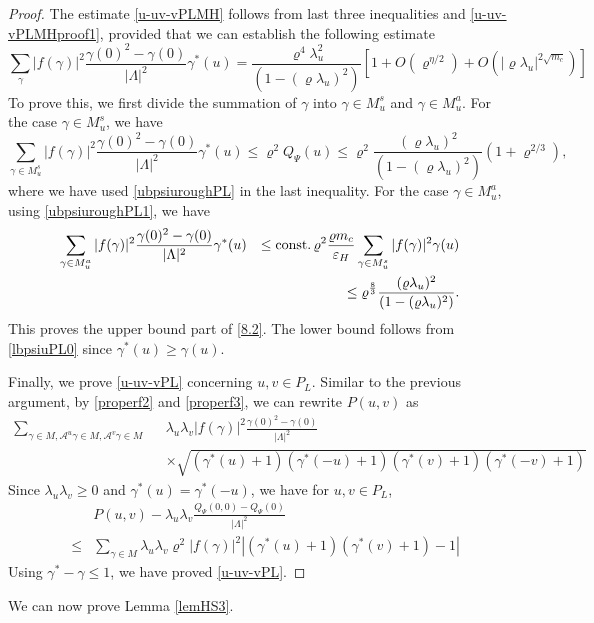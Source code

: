 \documentclass[11pt]{article}
\numberwithin{equation}{section}
\newcommand{\beq}{\begin{equation}}
\newcommand{\eeq}{\end{equation}}
\newcommand{\beqa}{\begin{eqnarray}}
\newcommand{\eeqa}{\end{eqnarray}}
\newcommand\eps{\varepsilon}
\newcommand\const{{\rm const.\, }}
\renewcommand\rho\varrho
\newtheorem{lem}{Lemma}[section]
\theoremstyle{definition}
\begin{document}
\begin{proof}
The estimate \eqref{u-uv-vPLMH} follows from last three inequalities and \eqref{u-uv-vPLMHproof1},   provided 
that we can establish the following estimate
\beq\label{8.2}
\sum_{\gamma} |f(\gamma)|^2\frac{\gamma(0)^2-\gamma(0)}{|\Lambda|^2}\gamma^*(u) 
=\frac{\rho^{4}\lambda_u^2}{(1-(\rho\lambda_u)^2)}[1 + O(\rho^{\eta/2})+O(|\rho\lambda_u|^{2\sqrt{m_c}})]
\eeq
To prove this, we first divide the summation of $\gamma$ into $\gamma\in M_u^s$ and $\gamma\in M_u^a$. 
For the case $\gamma\in M_u^s$, we have 
\beq
\sum_{\gamma \in M_u^s}|f(\gamma)|^2\frac{\gamma(0)^2-\gamma(0)}{|\Lambda|^2}\gamma^*(u)\leq\rho^2Q_\Psi(u)
\le  \rho^2\frac{(\rho\lambda_u)^2}{(1-(\rho\lambda_u)^2)}(1+\rho^{2/3}),
\eeq
where we have used \eqref{ubpsiuroughPL} in the last inequality. 
For the case $\gamma\in M_u^a$, using \eqref{ubpsiuroughPL1}, we have 
\beqa\nonumber
\sum_{\gamma \in M_u^a}|f(\gamma)|^2\frac{\gamma(0)^2-\gamma(0)}{|\Lambda|^2}\gamma^*(u)&&\leq
\const\rho^2 \frac{\rho m_{c}}{\eps_H}\sum_{\gamma\in M_u^s}|f(\gamma)|^2\gamma(u)\\
&&\le  \rho^{\frac{8}{3}}\frac{(\rho\lambda_u)^2}{(1-(\rho\lambda_u)^2)}.
\eeqa
This proves the upper bound part of \eqref{8.2}. The lower bound 
follows from  \eqref{lbpsiuPL0} since $\gamma^*(u) \ge \gamma(u)$. 




Finally,  we prove  \eqref{u-uv-vPL} concerning $u,v\in P_L$. Similar to the previous argument, by \eqref{properf2} and \eqref{properf3}, we can rewrite $P(u,v)$ as
\beqa\label{u-uv-vPLproof1}
\sum_{\gamma\in M, \mathcal A^{u}  \gamma \in M, \mathcal A^{v}  \gamma \in M}  && \lambda_u\lambda_v|f(\gamma)|^2\frac{\gamma(0)^2-\gamma(0)}{|\Lambda|^2} \\
&& \times  \sqrt{(\gamma^*(u)+1)(\gamma^*(-u)+1)(\gamma^*(v)+1)(\gamma^*(-v)+1)}\nonumber 
\eeqa 
Since  $\lambda_u\lambda_v\geq0$ and $\gamma^*(u)=\gamma^*(-u)$, we have for $u,v\in P_L$,
\beqa\nonumber
&&P(u,v)-\lambda_u\lambda_v\frac{Q_\Psi(0,0)-Q_\Psi(0)}{|\Lambda|^2}\\
&\leq& \sum_{\gamma\in M} \lambda_u\lambda_v\rho^2|f(\gamma)|^2\left|(\gamma^*(u)+1)(\gamma^*(v)+1)-1\right|
\eeqa
Using $\gamma^*-\gamma\leq 1$, we have proved  \eqref{u-uv-vPL}.
\end{proof}


We can now prove Lemma \ref{lemHS3}. %
%
\end{document}
